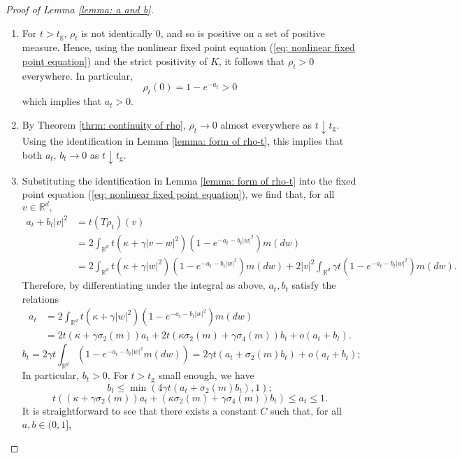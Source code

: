 \begin{proof}[Proof of Lemma \ref{lemma: a and b}] \begin{enumerate}[label=\roman{*}).]
    \item For $t>t_\mathrm{g}$, $\rho_t$ is not identically $0$, and so is positive on a set of positive measure. Hence, using the nonlinear fixed point equation (\ref{eq: nonlinear fixed point equation}) and the strict positivity of $K$, it follows that $\rho_t>0$ everywhere. In particular, \begin{equation}
        \rho_t(0)=1-e^{-a_t}>0
    \end{equation} which implies that $a_t>0.$
    \item By Theorem \ref{thrm: continuity of rho},  $\rho_t\rightarrow 0$ almost everywhere as $t\downarrow t_\mathrm{g}$. Using the identification in Lemma \ref{lemma: form of rho-t}, this implies that both $a_t$, $b_t \rightarrow 0$ as $t\downarrow t_\mathrm{g}$.
    \item Substituting the identification in Lemma \ref{lemma: form of rho-t} into the fixed point equation (\ref{eq: nonlinear fixed point equation}), we find that, for all $v\in \mathbb{R}^d,$ \begin{equation}\begin{split} a_t+b_t|v|^2 &= t(T\rho_t)(v)\\ & =2\int_{\mathbb{R}^d}t(\kappa+\gamma|v-w|^2)\left(1-e^{-a_t-b_t|w|^2}\right)m(dw) \\ & = 2\int_{\mathbb{R}^d} t(\kappa+\gamma|w|^2)\left(1-e^{-a_t-b_t|w|^2}\right)m(dw)+2|v|^2\int_{\mathbb{R}^d}\gamma t \left(1-e^{-a_t-b_t|w|^2}\right)m(dw). \end{split} \end{equation} Therefore, by differentiating under the integral as above, $a_t, b_t$ satisfy the relations \begin{equation} \begin{split}
        a_t&=2\int_{\mathbb{R}^d} t(\kappa+\gamma|w|^2)\left(1-e^{-a_t-b_t|w|^2}\right)m(dw)\\[1ex]&=2t(\kappa+\gamma\sigma_2(m))a_t+2t(\kappa\sigma_2(m)+\gamma\sigma_4(m))b_t+o(a_t+b_t).
   \end{split} \end{equation}\begin{equation}
        b_t=2\gamma t\int_{\mathbb{R}^d}\left(1-e^{-a_t-b_t|w|^2}m(dw)\right)= 2\gamma t(a_t+\sigma_2(m) b_t)+o(a_t+b_t);
    \end{equation} In particular, $b_t>0$. For $t>t_\mathrm{g}$ small enough, we have \begin{equation} b_t\le \min\left(4\gamma t(a_t+\sigma_2(m)b_t),1\right);  \end{equation} \begin{equation}  t((\kappa+\gamma\sigma_2(m))a_t+(\kappa\sigma_2(m)+\gamma\sigma_4(m))b_t) \le a_t \le 1. \end{equation} It is straightforward to see that there exists a constant $C$ such that, for all $a, b \in (0,1]$, \begin{equation}

\end{equation}
\end{enumerate}
\end{proof}
